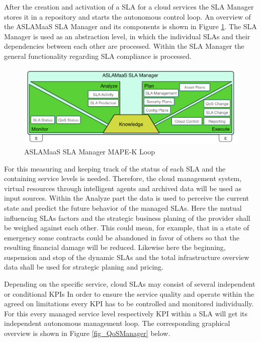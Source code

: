 After the creation and activation of a  SLA for a cloud services the SLA Manager stores it in a repository and starts the autonomous control loop. An overview of the ASLAMaaS SLA Manager and its components is shown in Figure \ref{fig_SLAManager}. The SLA Manager is used as an abstraction level, in which the individual SLAs and their dependencies between each other are processed. Within the SLA Manager the general functionality regarding SLA compliance is processed. 

\begin{figure}[!ht]
\centering
\includegraphics[width=5.3in]{chapters/chapter4/fig/SLAMan.PNG}
\caption{ASLAMaaS SLA Manager MAPE-K Loop }
\label{fig_SLAManager}
\end{figure}

For this measuring and keeping track of the status of each SLA and the containing service levels is needed. Therefore, the cloud management system,  virtual resources through intelligent agents and archived data will be used as input sources. Within the Analyze part the data is used to perceive the current state and predict the future behavior of the managed SLAs. Here the mutual influencing SLAs factors and the strategic business planing of the provider shall be weighed against each other. This could mean, for example, that in a state of emergency some contracts could be abandoned in favor of others so that the resulting financial damage will be reduced. Likewise here the beginning, suspension and stop of the dynamic SLAs and the total infrastructure overview data shall be used for strategic planing and pricing.  

Depending on the specific service, cloud SLAs may consist of several independent or conditional KPIs In order to ensure the service quality and operate within the agreed on limitations every KPI has to be controlled and monitored individually. For this every managed service level respectively KPI within a SLA will get its independent autonomous management loop. The corresponding graphical overview is shown in Figure \ref{fig_QoSManager} below.

